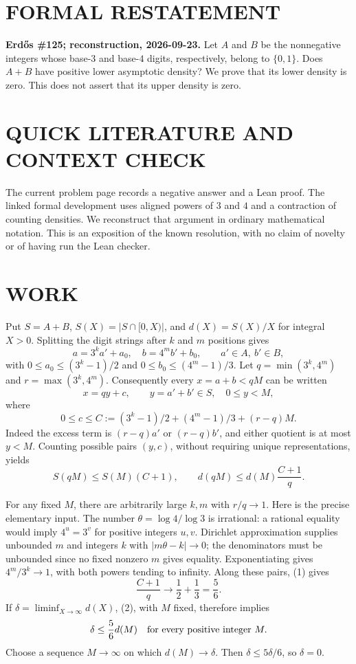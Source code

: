 \section{FORMAL RESTATEMENT}
\textbf{Erd\H{o}s \#125; reconstruction, 2026-09-23.}
Let $A$ and $B$ be the nonnegative integers whose base-$3$ and base-$4$
digits, respectively, belong to $\{0,1\}$. Does $A+B$ have positive
lower asymptotic density? We prove that its lower density is zero.
This does not assert that its upper density is zero.

\section{QUICK LITERATURE AND CONTEXT CHECK}
The current problem page records a negative answer and a Lean proof.
The linked formal development uses aligned powers of $3$ and $4$ and a
contraction of counting densities. We reconstruct that argument in
ordinary mathematical notation. This is an exposition of the known
resolution, with no claim of novelty or of having run the Lean checker.

\section{WORK}
Put $S=A+B$, $S(X)=|S\cap[0,X)|$, and $d(X)=S(X)/X$ for integral $X>0$.
Splitting the digit strings after $k$ and $m$ positions gives
\[
 a=3^k a'+a_0,\quad b=4^m b'+b_0,
 \qquad a'\in A,\ b'\in B,
\]
with $0\le a_0\le(3^k-1)/2$ and $0\le b_0\le(4^m-1)/3$.
Let $q=\min(3^k,4^m)$ and $r=\max(3^k,4^m)$. Consequently every
$x=a+b<qM$ can be written
\[
 x=qy+c,\qquad y=a'+b'\in S,\quad 0\le y<M,
\]
where
\[
 0\le c\le C:=(3^k-1)/2+(4^m-1)/3+(r-q)M.       \tag{1}
\]
Indeed the excess term is $(r-q)a'$ or $(r-q)b'$, and either quotient
is at most $y<M$. Counting possible pairs $(y,c)$, without requiring
unique representations, yields
\[
 S(qM)\le S(M)(C+1),\qquad
 d(qM)\le d(M)\frac{C+1}{q}.                    \tag{2}
\]

For any fixed $M$, there are arbitrarily large $k,m$ with $r/q\to1$.
Here is the precise elementary input. The number
$\theta=\log4/\log3$ is irrational: a rational equality would imply
$4^u=3^v$ for positive integers $u,v$. Dirichlet approximation supplies
unbounded $m$ and integers $k$ with $|m\theta-k|\to0$; the denominators
must be unbounded since no fixed nonzero $m$ gives equality. Exponentiating
gives $4^m/3^k\to1$, with both powers tending to infinity.
Along these pairs, (1) gives
\[
 \frac{C+1}{q}\longrightarrow\frac12+\frac13=\frac56.
\]
If $\delta=\liminf_{X\to\infty}d(X)$, (2), with $M$ fixed, therefore implies
\[
 \delta\le\frac56d(M)\quad\hbox{for every positive integer }M.
\]
Choose a sequence $M\to\infty$ on which $d(M)\to\delta$. Then
$\delta\le5\delta/6$, so $\delta=0$.

